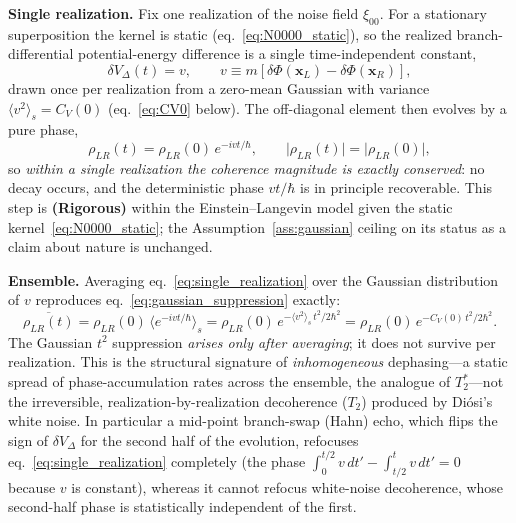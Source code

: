 \documentclass[12pt,a4paper]{article}
\theoremstyle{remark}
\begin{document}
\textbf{Single realization.} Fix one realization of the noise field $\xi_{00}$. For a
stationary superposition the kernel is static (eq.~\eqref{eq:N0000_static}), so the realized
branch-differential potential-energy difference is a single time-independent constant,
\begin{equation}
\delta V_\Delta(t) = v, \qquad
v \equiv m\!\left[\delta\Phi(\mathbf{x}_L) - \delta\Phi(\mathbf{x}_R)\right],
\label{eq:single_v}
\end{equation}
drawn once per realization from a zero-mean Gaussian with variance
$\langle v^2\rangle_s = C_V(0)$ (eq.~\eqref{eq:CV0} below). The off-diagonal element then
evolves by a pure phase,
\begin{equation}
\rho_{LR}(t) = \rho_{LR}(0)\,e^{-i v t/\hbar}, \qquad
\bigl|\rho_{LR}(t)\bigr| = \bigl|\rho_{LR}(0)\bigr|,
\label{eq:single_realization}
\end{equation}
so \emph{within a single realization the coherence magnitude is exactly conserved}: no decay
occurs, and the deterministic phase $vt/\hbar$ is in principle recoverable. This step is
\textbf{(Rigorous)} within the Einstein--Langevin model given the static
kernel~\eqref{eq:N0000_static}; the Assumption~\ref{ass:gaussian} ceiling on its status as a
claim about nature is unchanged.

\textbf{Ensemble.} Averaging eq.~\eqref{eq:single_realization} over the Gaussian
distribution of $v$ reproduces eq.~\eqref{eq:gaussian_suppression} exactly:
\begin{equation}
\overline{\rho_{LR}(t)}
= \rho_{LR}(0)\,\bigl\langle e^{-i v t/\hbar}\bigr\rangle_s
= \rho_{LR}(0)\,e^{-\langle v^2\rangle_s\, t^2/2\hbar^2}
= \rho_{LR}(0)\,e^{-C_V(0)\,t^2/2\hbar^2}.
\label{eq:ensemble_recovers}
\end{equation}
The Gaussian $t^2$ suppression \emph{arises only after averaging}; it does not survive per
realization. This is the structural signature of \emph{inhomogeneous} dephasing---a static
spread of phase-accumulation rates across the ensemble, the analogue of $T_2^\ast$---not the
irreversible, realization-by-realization decoherence ($T_2$) produced by Di\'osi's white
noise. In particular a mid-point branch-swap (Hahn) echo, which flips the sign of
$\delta V_\Delta$ for the second half of the evolution, refocuses
eq.~\eqref{eq:single_realization} completely (the phase
$\int_0^{t/2}\!v\,dt' - \int_{t/2}^{t}\!v\,dt' = 0$ because $v$ is constant), whereas it
cannot refocus white-noise decoherence, whose second-half phase is statistically
independent of the first.
\end{document}
